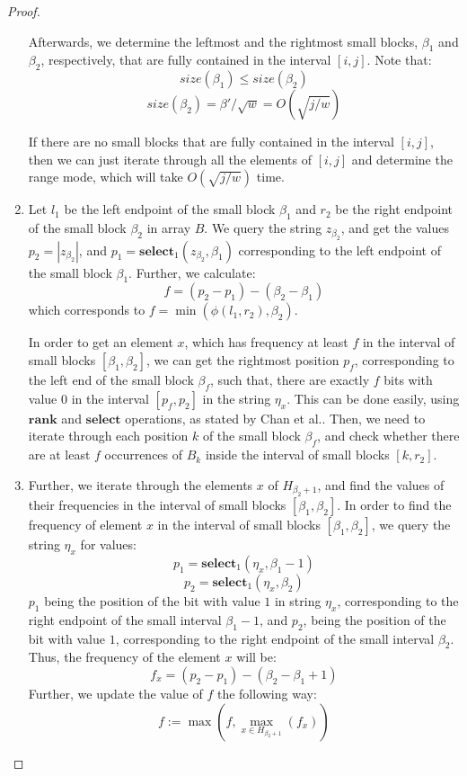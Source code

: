 \documentclass[runningheads]{llncs}
\begin{document}
\begin{proof}
\begin{enumerate}
        Afterwards, we determine the leftmost and the rightmost small blocks, $\beta_1$ and $\beta_2$, respectively, that are fully contained in the interval $[i,j]$. Note that:
        \[
            size(\beta_1)\leq size(\beta_2)
        \]
        \[
            size(\beta_2) = \beta'/\sqrt{w} = O(\sqrt{j/w})
        \]
        
        If there are no small blocks that are fully contained in the interval $[i,j]$, then we can just iterate through  all the elements of $[i,j]$ and determine the range mode, 
        which will take $O(\sqrt{j/w})$ time.

        \item   Let $l_1$ be the left endpoint of the small block $\beta_1$ and $r_2$ be the right endpoint of the small block $\beta_2$ in array $B$.        
                We query the string $z_{\beta_2}$, and get the values $p_2=|z_{\beta_2}|$, and $p_1=\textbf{select}_{1}(z_{\beta_2}, \beta_1)$ 
                corresponding to the left endpoint of the small block $\beta_1$. 
                Further, we calculate:
                \[
                    f = ( p_2 - p_1 )-( \beta_2 - \beta_1 )
                \] 
                which corresponds to $f=\min( \phi(  l_1, r_2 ), \beta_2)$.

                In order to get an element $x$, which has frequency at least $f$ in the interval of small blocks $[\beta_1, \beta_2]$, we can get the rightmost position $p_f$, 
                corresponding to the left end of the small block $\beta_f$, such that, there are exactly $f$ bits with value $0$ in the interval $[p_f, p_2]$ in the string $\eta_x$. 
                This can be done easily, using $\textbf{rank}$ and $\textbf{select}$ 
                operations, as stated by Chan et al.\cite{chan2014linear}. Then, we need to iterate 
                through each position $k$ of the small block $\beta_f$, and check whether there are at least $f$ occurrences of $B_k$ inside the interval of small blocks $[ k , r_2 ]$.

        \item Further, we iterate through the elements $x$ of $H_{\beta_2+1}$, and find the values of their frequencies in the interval of small blocks $[\beta_1,\beta_2]$.
              In order to find the frequency of element $x$ in the interval of small blocks $[\beta_1, \beta_2]$, we query the string $\eta_x$ for values:
              \[
                    p_1=\textbf{select}_1(\eta_x,\beta_1-1)
              \]
              \[
                    p_2 = \textbf{select}_1(\eta_x, \beta_2 )
              \]
            $p_1$ being the position of the bit with value $1$ in string $\eta_x$, corresponding to the right endpoint of the small interval $\beta_1-1$, and $p_2$, being the position 
            of the bit with value $1$, corresponding to the right endpoint of the small interval $\beta_2$.
            Thus, the  frequency of the element $x$ will be:
            \[
                f_x=(p_2-p_1)-( \beta_2-\beta_1+1 )
            \]
            Further, we update the value of $f$ the following way: 
            \[
                f := \max(f, \max_{x \in H_{\beta_2+1}}(f_x) )
            \]


\end{enumerate}
\end{proof}
\end{document}
